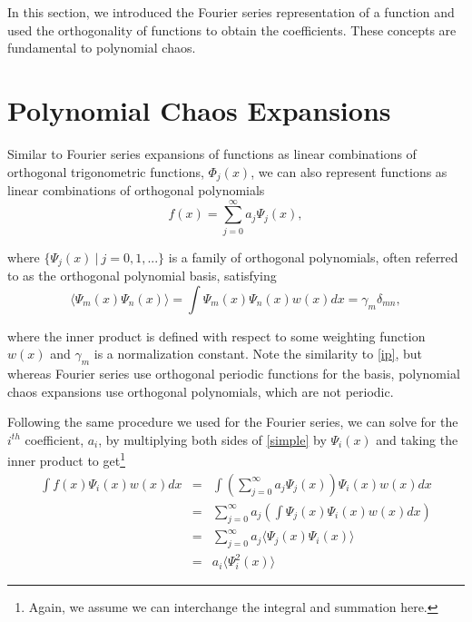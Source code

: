 \documentclass[11pt]{article}
\numberwithin{equation}{section}
\begin{document}
In this section, we introduced the Fourier series representation of a function and used the orthogonality of functions to obtain the coefficients. These concepts are fundamental to polynomial chaos.









\section{Polynomial Chaos Expansions}

Similar to Fourier series expansions of functions as linear combinations of orthogonal trigonometric functions, $\Phi_j(x)$, we can also represent functions as linear combinations of orthogonal polynomials
\begin{equation}
f(x) = \sum_{j=0}^{\infty}  a_j \Psi_j(x), \label{simple}
\end{equation}

where $\{ \Psi_j(x) \ | \ j = 0, 1, ... \}$ is a family of orthogonal polynomials, often referred to as the orthogonal polynomial basis, satisfying
\begin{equation}
\langle \Psi_m(x) \Psi_n(x) \rangle = \int \Psi_m(x) \Psi_n(x) w(x) dx = \gamma_m \delta_{mn}, \label{orth_poly}
\end{equation}

where the inner product is defined with respect to some weighting function $w(x)$ and $\gamma_m$ is a normalization constant. Note the similarity to \eqref{ip}, but whereas Fourier series use orthogonal periodic functions for the basis, polynomial chaos expansions use orthogonal polynomials, which are not periodic.

\qquad Following the same procedure we used for the Fourier series, we can solve for the $i^{th}$ coefficient, $a_i$, by multiplying both sides of \eqref{simple} by $\Psi_i(x)$ and taking the inner product to get\footnote{Again, we assume we can interchange the integral and summation here.} 
\begin{eqnarray*}
\int f(x) \Psi_i(x) w(x) dx & = & \int \left( \sum_{j = 0}^{\infty} a_j \Psi_j(x) \right) \Psi_i(x) w(x) dx \\
& = & \sum_{j = 0}^{\infty}  a_j  \left( \int \Psi_j(x) \Psi_i(x) w(x) dx \right) \\
& = & \sum_{j = 0}^{\infty}  a_j  \langle \Psi_j(x) \Psi_i(x) \rangle \\
& = & a_i  \langle \Psi_i^2(x) \rangle
\end{eqnarray*}
\end{document}
